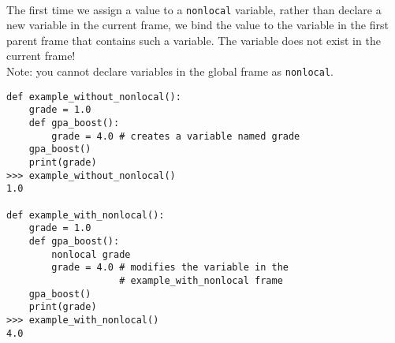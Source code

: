 %
\\The first time we assign a value to a \lstinline{nonlocal} variable, rather than declare a new variable in the current frame, we bind the value to the variable in the first parent frame that contains such a variable. The variable does not exist in the current frame!
\\Note: you cannot declare variables in the global frame as \lstinline{nonlocal}.
\newline
\begin{lstlisting}
def example_without_nonlocal():
    grade = 1.0
    def gpa_boost():
        grade = 4.0 # creates a variable named grade
    gpa_boost()
    print(grade)
>>> example_without_nonlocal()
1.0

def example_with_nonlocal():
    grade = 1.0
    def gpa_boost():
        nonlocal grade
        grade = 4.0 # modifies the variable in the
                    # example_with_nonlocal frame
    gpa_boost()
    print(grade)
>>> example_with_nonlocal()
4.0
\end{lstlisting}
